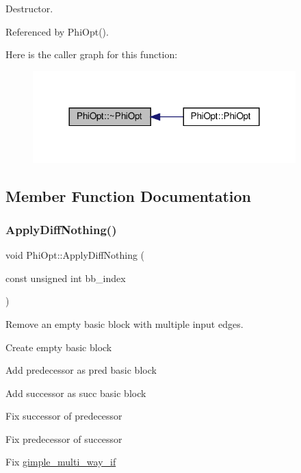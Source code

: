 Destructor. 



Referenced by Phi\+Opt().

Here is the caller graph for this function\+:
\nopagebreak
\begin{figure}[H]
\begin{center}
\leavevmode
\includegraphics[width=288pt]{dc/ddf/classPhiOpt_ab5e673afa29877e20a18490e4193a9d4_icgraph}
\end{center}
\end{figure}


\subsection{Member Function Documentation}
\mbox{\label{classPhiOpt_a5d7228a841bc0ddd41c3bad7c338d7c2}} 
\subsubsection{\texorpdfstring{Apply\+Diff\+Nothing()}{ApplyDiffNothing()}}
{\footnotesize\ttfamily void Phi\+Opt\+::\+Apply\+Diff\+Nothing (\begin{DoxyParamCaption}\item[{const unsigned int}]{bb\+\_\+index }\end{DoxyParamCaption})\hspace{0.3cm}{\ttfamily [private]}}



Remove an empty basic block with multiple input edges. 

Create empty basic block

Add predecessor as pred basic block

Add successor as succ basic block

Fix successor of predecessor

Fix predecessor of successor

Fix \hyperlink{structgimple__multi__way__if}{gimple\+\_\+multi\+\_\+way\+\_\+if}

